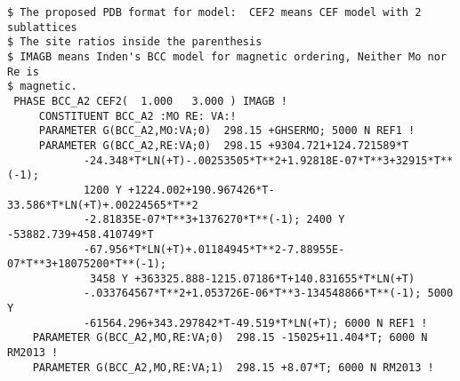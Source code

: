 \documentclass[12pt]{article}
\begin{document}
{\begin{verbatim}
$ The proposed PDB format for model:  CEF2 means CEF model with 2 sublattices
$ The site ratios inside the parenthesis
$ IMAGB means Inden's BCC model for magnetic ordering, Neither Mo nor Re is
$ magnetic.
 PHASE BCC_A2 CEF2(  1.000   3.000 ) IMAGB !
     CONSTITUENT BCC_A2 :MO RE: VA:!
     PARAMETER G(BCC_A2,MO:VA;0)  298.15 +GHSERMO; 5000 N REF1 !
     PARAMETER G(BCC_A2,RE:VA;0)  298.15 +9304.721+124.721589*T
            -24.348*T*LN(+T)-.00253505*T**2+1.92818E-07*T**3+32915*T**(-1); 
            1200 Y +1224.002+190.967426*T-33.586*T*LN(+T)+.00224565*T**2
            -2.81835E-07*T**3+1376270*T**(-1); 2400 Y -53882.739+458.410749*T
            -67.956*T*LN(+T)+.01184945*T**2-7.88955E-07*T**3+18075200*T**(-1);
             3458 Y +363325.888-1215.07186*T+140.831655*T*LN(+T)
            -.033764567*T**2+1.053726E-06*T**3-134548866*T**(-1); 5000 Y 
            -61564.296+343.297842*T-49.519*T*LN(+T); 6000 N REF1 !
    PARAMETER G(BCC_A2,MO,RE:VA;0)  298.15 -15025+11.404*T; 6000 N RM2013 !
    PARAMETER G(BCC_A2,MO,RE:VA;1)  298.15 +8.07*T; 6000 N RM2013 !


\end{verbatim}}
\end{document}
